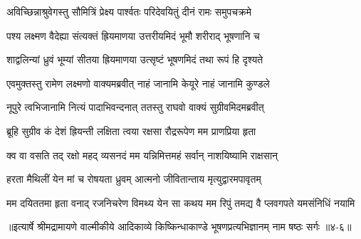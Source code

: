 \twolineshloka
{अविच्छिन्नाश्रुवेगस्तु सौमित्रिं प्रेक्ष्य पार्श्वतः}
{परिदेवयितुं दीनं रामः समुपचक्रमे} %

\twolineshloka
{पश्य लक्ष्मण वैदेह्या संत्यक्तं ह्रियमाणया}
{उत्तरीयमिदं भूमौ शरीराद् भूषणानि च} %

\twolineshloka
{शाद्वलिन्यां ध्रुवं भूम्यां सीतया ह्रियमाणया}
{उत्सृष्टं भूषणमिदं तथा रूपं हि दृश्यते} %

\twolineshloka
{एवमुक्तस्तु रामेण लक्ष्मणो वाक्यमब्रवीत्}
{नाहं जानामि केयूरे नाहं जानामि कुण्डले} %

\twolineshloka
{नूपुरे त्वभिजानामि नित्यं पादाभिवन्दनात्}
{ततस्तु राघवो वाक्यं सुग्रीवमिदमब्रवीत्} %

\twolineshloka
{ब्रूहि सुग्रीव कं देशं ह्रियन्ती लक्षिता त्वया}
{रक्षसा रौद्ररूपेण मम प्राणप्रिया हृता} %

\twolineshloka
{क्व वा वसति तद् रक्षो महद् व्यसनदं मम}
{यन्निमित्तमहं सर्वान् नाशयिष्यामि राक्षसान्} %

\twolineshloka
{हरता मैथिलीं येन मां च रोषयता ध्रुवम्}
{आत्मनो जीवितान्ताय मृत्युद्वारमपावृतम्} %

\twolineshloka
{मम दयिततमा हृता वनाद् रजनिचरेण विमथ्य येन सा}
{कथय मम रिपुं तमद्य वै प्लवगपते यमसंनिधिं नयामि} %


॥इत्यार्षे श्रीमद्रामायणे वाल्मीकीये आदिकाव्ये किष्किन्धाकाण्डे भूषणप्रत्यभिज्ञानम् नाम षष्ठः सर्गः ॥४-६॥
